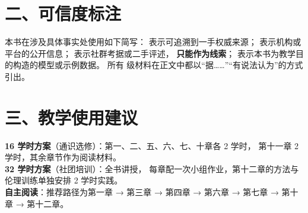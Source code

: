 \section*{二、可信度标注}

本书在涉及具体事实处使用如下简写： 表示可追溯到一手权威来源；
 表示机构或平台的公开信息； 表示社群考据或二手评述，
\textbf{只能作为线索}； 表示本书为教学目的构造的模型或示例数据。
所有  级材料在正文中都以“据……”“有说法认为”的方式引出。

\section*{三、教学使用建议}

\begin{nlmethod}[教学使用建议]
  \textbf{16 学时方案}（通识选修）：第一、二、五、六、七、十章各 2 学时，
  第十一章 2 学时，其余章节作为阅读材料。\\
  \textbf{32 学时方案}（社团培训）：全书讲授，
  每章配一次小组作业，第十二章的方法与伦理训练单独安排 2 学时实践。\\
  \textbf{自主阅读}：推荐路径为第一章 → 第三章 → 第四章 → 第六章 → 第七章 →
  第十章 → 第十二章。
\end{nlmethod}

